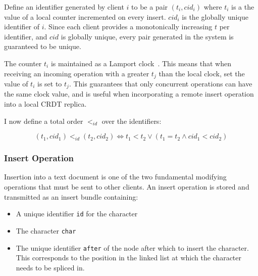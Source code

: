 \documentclass[12pt,a4paper,twoside,openright]{report}
\begin{document}
		Define an identifier generated by client $i$ to be a pair $(t_i, cid_i)$ where $t_i$ is a the value of a local counter incremented on every insert. $cid_i$ is the globally unique identifier of $i$. Since each client provides a monotonically increasing $t$ per identifier, and $cid$ is globally unique, every pair generated in the system is guaranteed to be unique.
		
		The counter $t_i$ is maintained as a Lamport clock~\cite{lamport1978}. This means that when receiving an incoming operation with a greater $t_j$ than the local clock, set the value of $t_i$ is set to $t_j$. This guarantees that only concurrent operations can have the same clock value, and is useful when incorporating a remote insert operation into a local CRDT replica.
		
		
		I now define a total order $<_{id}$ over the identifiers:
		
		\[(t_1, cid_1) <_{id} (t_2, cid_2) \Leftrightarrow t_1 < t_2 \lor (t_1 = t_2 \land cid_1 < cid_2)\]
		
		
		\subsubsection{Insert Operation}
			Insertion into a text document is one of the two fundamental modifying operations that must be sent to other clients. An insert operation is stored and transmitted as an insert bundle containing: 
			\begin{itemize}
				\item A unique identifier \texttt{id} for the character
				\item The character \texttt{char}
				\item The unique identifier \texttt{after} of the node after which to insert the character. This corresponds to the position in the linked list at which the character needs to be spliced in.
			\end{itemize}
			
\end{document}
